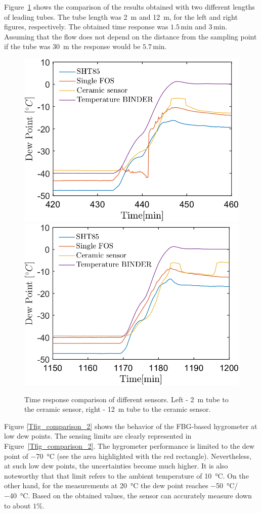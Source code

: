 Figure~\ref{fig_comparison_hw} shows the comparison of the results obtained with two different lengths of leading tubes. The tube length was \SI{2}{\metre} and \SI{12}{\metre}, for the left and right figures, respectively. The obtained time response was $1.5$\,min and $3$\,min. Assuming that the flow does not depend on the distance from the sampling point if the tube was \SI{30}{\metre} the response would be $5.7$\,min. 
\begin{figure}[!h]
\centering
\includegraphics[width=0.47\columnwidth]{Chapter5/images/DPCPercent_response2m.png}
\includegraphics[width=0.47\columnwidth]{Chapter5/images/DPCPercent_response12m.png}
\caption{Time response comparison of different sensors. Left - \SI{2}{\metre} tube to the ceramic sensor, right - \SI{12}{\metre} tube to the ceramic sensor.}
\label{fig_comparison_hw}
\end{figure}
\newpage
Figure \ref{Tfig_comparison_2} shows the behavior of the \gls{FBG}-based hygrometer at low dew points. The sensing limits are clearly represented in Figure~\ref{Tfig_comparison_2}. The hygrometer performance is limited to the dew point of \SI{-70}{\celsius} (see the area highlighted with the red rectangle). Nevertheless, at such low dew points, the uncertainties become much higher. It is also noteworthy that that limit refers to the ambient temperature of \SI{10}{\celsius}. On the other hand, for the measurements at \SI{20}{\celsius} the dew point reaches \SI{-50}{\celsius}/\SI{-40}{\celsius}. Based on the obtained values, the sensor can accurately measure down to about $1$\%. 

